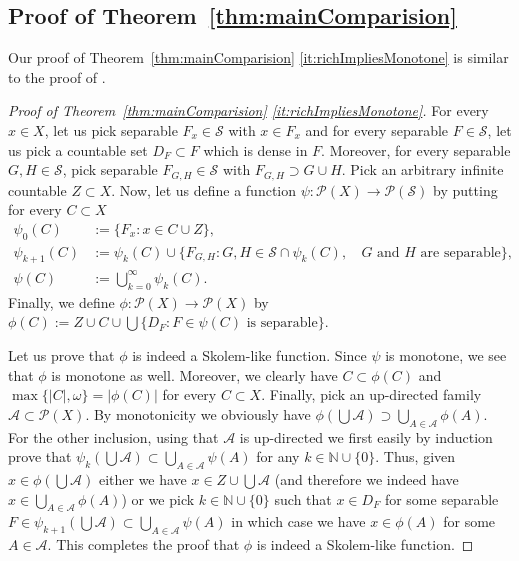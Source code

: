 \documentclass[11pt]{amsart}
\theoremstyle{definition}
\theoremstyle{remark}
\newcommand{\Nat}{\mathbb N}
\newcommand{\A}{\mathcal A}
\newcommand{\PP}{\mathcal P}
\newcommand{\SSS}{\mathcal S}
\begin{document}
\subsection{Proof of Theorem~\ref{thm:mainComparision}}\label{subsec:prfComparision} Our proof of Theorem~\ref{thm:mainComparision} \eqref{it:richImpliesMonotone} is similar to the proof of \cite[Theorem 19]{C18}.

\begin{proof}[Proof of Theorem~\ref{thm:mainComparision} \eqref{it:richImpliesMonotone}]For every $x\in X$, let us pick separable $F_x \in\SSS$ with $x\in F_x$ and for every separable $F\in\SSS$, let us pick a
countable set $D_F \subset F$ which is dense in $F$. Moreover, for every separable $G, H\in\SSS$, pick separable $F_{G,H}\in\SSS$ with
$F_{G,H}\supset G \cup H$.  Pick an arbitrary infinite countable $Z\subset X$. Now, let us define a function $\psi:\PP(X)\to\PP(\SSS)$ by putting for every $C\subset X$
\[\begin{split}
\psi_0(C) & :=\{F_x\colon x\in C\cup Z\},\\
\psi_{k+1}(C)&:=\psi_k(C)\cup \{F_{G,H}\colon G,H\in\SSS\cap \psi_k(C),\;\text{ $G$ and $H$ are separable}\},\\
\psi(C)& :=\bigcup_{k=0}^\infty \psi_k(C).
\end{split}
\]
Finally, we define $\phi:\PP(X)\to \PP(X)$ by $\phi(C):=Z\cup C\cup \bigcup\{D_F\colon F\in \psi(C)\text{ is separable}\}$.

Let us prove that $\phi$ is indeed a Skolem-like function. Since $\psi$ is monotone, we see that $\phi$ is monotone as well. Moreover, we clearly have $C\subset \phi(C)$ and $\max\{|C|,\omega\} = |\phi(C)|$ for every $C\subset X$. Finally, pick an up-directed family $\A\subset \PP(X)$. By monotonicity we obviously have $\phi(\bigcup\A)\supset \bigcup_{A\in\A}\phi(A)$. For the other inclusion, using that $\A$ is up-directed we first easily by induction prove that $\psi_k(\bigcup \A) \subset \bigcup_{A\in \A}\psi(A)$ for any $k\in\Nat\cup\{0\}$. Thus, given $x\in \phi(\bigcup \A)$ either we have $x\in Z\cup \bigcup\A$ (and therefore we indeed have $x\in \bigcup_{A\in\A}\phi(A)$) or we pick $k\in\Nat\cup\{0\}$ such that $x\in D_F$ for some separable $F\in \psi_{k+1}(\bigcup \A) \subset \bigcup_{A\in\A}\psi(A)$ in which case we have $x\in \phi(A)$ for some $A\in\A$. This completes the proof that $\phi$ is indeed a Skolem-like function.


\end{proof}
\end{document}
